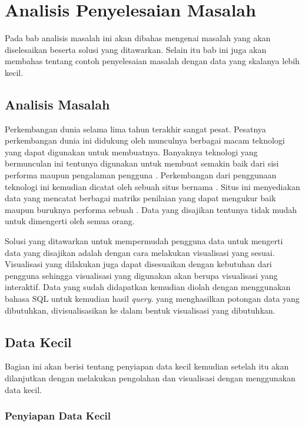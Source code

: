 \chapter{Analisis Penyelesaian Masalah}
\label{chLanalisis}

Pada bab analisis masalah ini akan dibahas mengenai masalah yang akan diselesaikan beserta solusi yang ditawarkan. Selain itu bab ini juga akan membahas tentang contoh penyelesaian masalah dengan data yang skalanya lebih kecil. 

\section{Analisis Masalah}
\label{sec: Analisis Masalah}

Perkembangan dunia \web selama lima tahun terakhir sangat pesat. Pesatnya perkembangan dunia \web ini didukung oleh munculnya berbagai macam teknologi yang dapat digunakan untuk membuatnya. Banyaknya teknologi yang bermunculan ini tentunya digunakan untuk membuat \web semakin baik dari sisi performa maupun pengalaman pengguna \web. Perkembangan dari penggunaan teknologi ini kemudian dicatat oleh sebuah situs bernama \http. Situs ini menyediakan data yang mencatat berbagai matriks penilaian yang dapat mengukur baik maupun buruknya performa sebuah \web. Data yang disajikan tentunya tidak mudah untuk dimengerti oleh semua orang. 

Solusi yang ditawarkan untuk mempermudah pengguna data untuk mengerti data yang disajikan adalah dengan cara melakukan visualisasi yang sesuai. Visualisasi yang dilakukan juga dapat disesuaikan dengan kebutuhan dari pengguna sehingga visualisasi yang digunakan akan berupa visualisasi yang interaktif. Data yang sudah didapatkan kemudian diolah dengan menggunakan bahasa SQL untuk kemudian hasil \textit{query}. yang menghasilkan potongan data yang dibutuhkan, divisualisasikan ke dalam bentuk visualisasi yang dibutuhkan.

\section{Data Kecil}
\label{sec: datakecil}

Bagian ini akan berisi tentang penyiapan data kecil kemudian setelah itu akan dilanjutkan dengan melakukan pengolahan dan visualisasi dengan menggunakan data kecil.

\subsection{Penyiapan Data Kecil}
\label{subsec:penyiapan data kecil}

